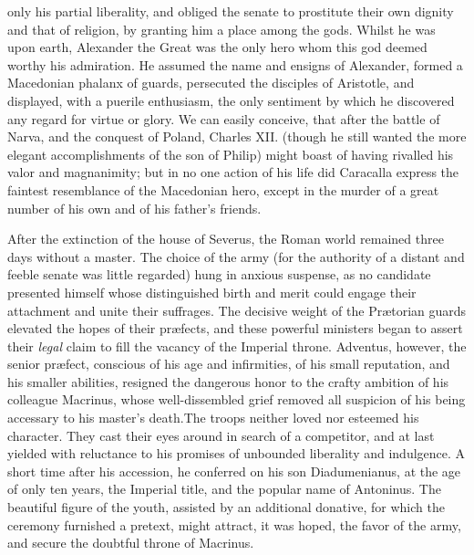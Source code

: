 only his partial liberality, and obliged the senate to prostitute
their own dignity and that of religion, by granting him a place
among the gods. Whilst he was upon earth, Alexander the Great was
the only hero whom this god deemed worthy his admiration. He
assumed the name and ensigns of Alexander, formed a Macedonian
phalanx of guards, persecuted the disciples of Aristotle, and
displayed, with a puerile enthusiasm, the only sentiment by which
he discovered any regard for virtue or glory. We can easily
conceive, that after the battle of Narva, and the conquest of
Poland, Charles XII. (though he still wanted the more elegant
accomplishments of the son of Philip) might boast of having
rivalled his valor and magnanimity; but in no one action of his
life did Caracalla express the faintest resemblance of the
Macedonian hero, except in the murder of a great number of his
own and of his father’s friends.\footnotemark[40]




After the extinction of the house of Severus, the Roman world
remained three days without a master. The choice of the army (for
the authority of a distant and feeble senate was little regarded)
hung in anxious suspense, as no candidate presented himself whose
distinguished birth and merit could engage their attachment and
unite their suffrages. The decisive weight of the Prætorian
guards elevated the hopes of their præfects, and these powerful
ministers began to assert their \textit{legal} claim to fill the vacancy
of the Imperial throne. Adventus, however, the senior præfect,
conscious of his age and infirmities, of his small reputation,
and his smaller abilities, resigned the dangerous honor to the
crafty ambition of his colleague Macrinus, whose well-dissembled
grief removed all suspicion of his being accessary to his
master’s death.\footnotemark[41] The troops neither loved nor esteemed his
character. They cast their eyes around in search of a competitor,
and at last yielded with reluctance to his promises of unbounded
liberality and indulgence. A short time after his accession, he
conferred on his son Diadumenianus, at the age of only ten years,
the Imperial title, and the popular name of Antoninus. The
beautiful figure of the youth, assisted by an additional
donative, for which the ceremony furnished a pretext, might
attract, it was hoped, the favor of the army, and secure the
doubtful throne of Macrinus.

